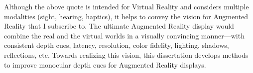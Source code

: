 
Although the above quote is intended for Virtual Reality and considers multiple modalities (sight, hearing, haptics), it helps to convey the vision for Augmented Reality that I subscribe to. 
The ultimate Augmented Reality display would combine the real and the virtual worlds in a visually convincing manner—with consistent depth cues, latency, resolution, color fidelity, lighting, shadows, reflections, etc. 
Towards realizing this vision, this dissertation develops methods to improve monocular depth cues for Augmented Reality displays. 

